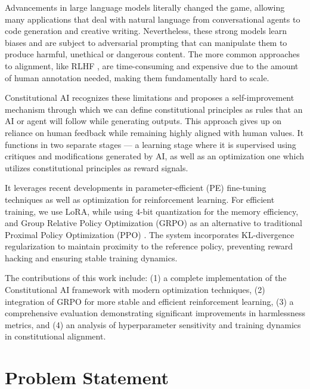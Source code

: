 \documentclass[conference]{IEEEtran}
\begin{document}
Advancements in large language models literally changed the game, allowing many applications that deal with natural language from conversational agents to code generation and creative writing. Nevertheless, these strong models learn biases and are subject to adversarial prompting \cite{perez2022red,ganguli2022red} that can manipulate them to produce harmful, unethical or dangerous content. The more common approaches to alignment, like RLHF \cite{christiano2017deep, ouyang2022training}, are time-consuming and expensive due to the amount of human annotation needed, making them fundamentally hard to scale.

Constitutional AI \cite{bai2022constitutional} recognizes these limitations and proposes a self-improvement mechanism through which we can define constitutional principles as rules that an AI or agent will follow while generating outputs. This approach gives up on reliance on human feedback while remaining highly aligned with human values. It functions in two separate stages — a learning stage where it is supervised using critiques and modifications generated by AI, as well as an optimization one which utilizes constitutional principles as reward signals.

It leverages recent developments in parameter-efficient (PE) fine-tuning techniques \cite{hu2021lora, dettmers2023qlora} as well as optimization for reinforcement learning. For efficient training, we use LoRA, while using 4-bit quantization for the memory efficiency, and Group Relative Policy Optimization (GRPO) as an alternative to traditional Proximal Policy Optimization (PPO) \cite{schulman2017proximal}. The system incorporates KL-divergence regularization \cite{korbak2022rl} to maintain proximity to the reference policy, preventing reward hacking \cite{skalse2022defining, gao2023scaling} and ensuring stable training dynamics.

The contributions of this work include: (1) a complete implementation of the Constitutional AI framework with modern optimization techniques, (2) integration of GRPO for more stable and efficient reinforcement learning, (3) a comprehensive evaluation demonstrating significant improvements in harmlessness metrics, and (4) an analysis of hyperparameter sensitivity and training dynamics in constitutional alignment.

\section{Problem Statement}
\end{document}
